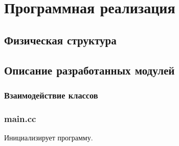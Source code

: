 
\chapter{Программная реализация}

\section{Физическая структура}

\section{Описание разработанных модулей}

\subsection{Взаимодействие классов}


\subsection{main.cc}

Инициализирует программу.
